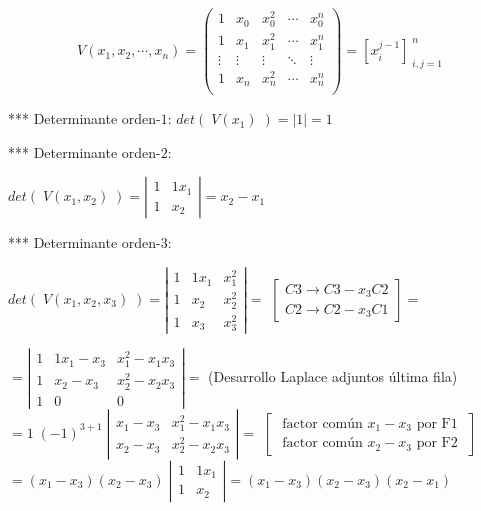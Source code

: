 \begin{equation*}
	V(x_1,x_2,\cdots ,x_n)=
	\left( \begin{matrix}
 	1&x_0&x_0^2&\cdots &x_0^n\\
 	1&x_1&x_1^2&\cdots &x_1^n\\
 	\vdots & \vdots & \vdots & \ddots & \vdots \\
 	1&x_n&x_n^2&\cdots &x_n^n\\
 \end{matrix} \right) 
 ={[x_i^{j-1}]}_{\;i,j=1}^{\;n}
\end{equation*}

*** Determinante orden-$1$:  $det(\;V(x_1)\;)=|1|=1$

*** Determinante orden-$2$: 

$det(\; V(x_1,x_2)\; )=\left| \begin{matrix} 1&1x_1 \\ 1&x_2 \end{matrix} \right|=x_2-x_1$

*** Determinante orden-$3$:

$det(\; V(x_1,x_2,x_3)\; )=\left| \begin{matrix} 1&1x_1&x_1^2 \\ 1&x_2&x_2^2 \\1&x_3&x_3^2 \end{matrix} \right|= $ \textcolor{gris}{$\left[ \begin{matrix} C3\to C3-x_3C2 \\ C2\to C2-x_3C1 \end{matrix}  \right]=$}  

$=\left| \begin{matrix} 1&1x_1-x_3&x_1^2-x_1x_3 \\ 1&x_2-x_3&x_2^2-x_2x_3 \\1&0&0 \end{matrix} \right| = $ \textcolor{gris}{(\footnotesize{Desarrollo Laplace adjuntos última fila})} $=1\; (-1)^{3+1}\; \left| \begin{matrix} x_1-x_3&x_1^2-x_1x_3 \\ x_2-x_3&x_2^2-x_2x_3 \end{matrix} \right|=$ \textcolor{gris}{$\left[ \begin{matrix} \text{ factor común } x_1-x_3 \text { por F1 }\\\text{ factor común } x_2-x_3 \text { por F2 } \end{matrix}  \right]$} $=(x_1-x_3)(x_2-x_3) \; \left| \begin{matrix} 1&1x_1 \\ 1&x_2 \end{matrix} \right|= (x_1-x_3)(x_2-x_3)(x_2-x_1)$

